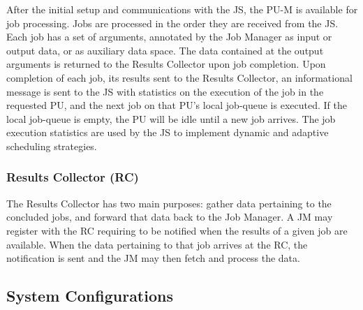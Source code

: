 \documentclass[runningheads,a4paper]{llncs}
\begin{document}
After the initial setup and communications with the JS, the PU-M is available for job processing. Jobs are processed in the order they are received from the JS\@.
%
Each job has a set of arguments, annotated by the Job Manager as input or output data, or as auxiliary data space. The data contained at the output arguments is returned to the Results Collector upon job completion. 
%
Upon completion of each job, its results sent to the Results Collector, an informational message is sent to the JS with statistics on the execution of the job in the requested PU\@, and the next job on that PU's local job-queue is executed. If the local job-queue is empty, the PU will be idle until a new job arrives. The job execution statistics are used by the JS to implement dynamic and adaptive scheduling strategies.


\subsubsection{Results Collector (RC)}
\label{subsub:result_collector}

The Results Collector has two main purposes: gather data pertaining to the concluded jobs, and forward that data back to the Job Manager.
%
A JM may register with the RC requiring to be notified when the results of a given job are available. When the data pertaining to that job arrives at the RC, the notification is sent and the JM may then fetch and process the data.


\subsection{System Configurations}
\label{sub:system_configurations}

\end{document}
